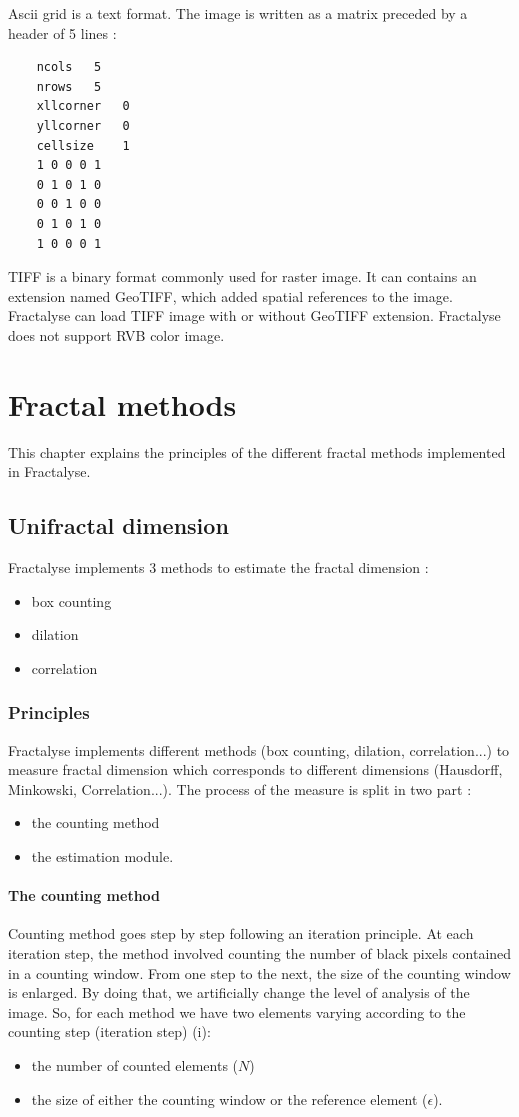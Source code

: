 \documentclass[a4paper,10pt]{report}
\begin{document}
Ascii grid is a text format. The image is written as a matrix preceded by a header of 5 lines :
\begin{Verbatim}
	ncols	5
	nrows	5
	xllcorner	0
	yllcorner	0
	cellsize	1
	1 0 0 0 1
	0 1 0 1 0
	0 0 1 0 0
	0 1 0 1 0
	1 0 0 0 1
\end{Verbatim}

TIFF is a binary format commonly used for raster image. It can contains an extension named GeoTIFF, which added spatial references to the image. Fractalyse can load TIFF image with or without GeoTIFF extension. Fractalyse does not support RVB color image.

\chapter{Fractal methods}
This chapter explains the principles of the different fractal methods implemented in Fractalyse. 
\section{Unifractal dimension}
Fractalyse implements 3 methods to estimate the fractal dimension :
\begin{itemize}
	\item box counting
	\item dilation
	\item correlation
\end{itemize}

\subsection{Principles}
Fractalyse implements different methods (box counting, dilation, correlation...) to measure fractal dimension which corresponds to different dimensions (Hausdorff, Minkowski, Correlation...). The process of the measure is split in two part :
\begin{itemize}
	\item the counting method
	\item the estimation module.
\end{itemize}

\subsubsection{The counting method}

Counting method goes step by step following an iteration principle. At each iteration step, the method involved counting the number of black pixels contained in a counting window. From one step to the next, the size of the counting window is enlarged. By doing that, we artificially change the level of analysis of the image. So, for each method we have two elements varying according to the counting step (iteration step) (i):
\begin{itemize}
	\item the number of counted elements ($N$)
	\item the size of either the counting window or the reference element ($\epsilon$).
\end{itemize}
	
\end{document}
